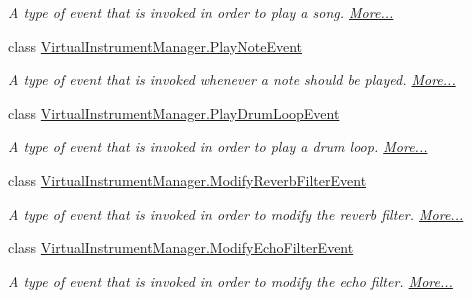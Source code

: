 \begin{DoxyCompactItemize}
\begin{DoxyCompactList}\small\item\em A type of event that is invoked in order to play a song.  \hyperlink{group___virtual_instrument_manager_class_virtual_instrument_manager_1_1_play_song_event}{More...}\end{DoxyCompactList}\item 
class \hyperlink{group___virtual_instrument_manager_class_virtual_instrument_manager_1_1_play_note_event}{Virtual\+Instrument\+Manager.\+Play\+Note\+Event}
\begin{DoxyCompactList}\small\item\em A type of event that is invoked whenever a note should be played.  \hyperlink{group___virtual_instrument_manager_class_virtual_instrument_manager_1_1_play_note_event}{More...}\end{DoxyCompactList}\item 
class \hyperlink{group___virtual_instrument_manager_class_virtual_instrument_manager_1_1_play_drum_loop_event}{Virtual\+Instrument\+Manager.\+Play\+Drum\+Loop\+Event}
\begin{DoxyCompactList}\small\item\em A type of event that is invoked in order to play a drum loop.  \hyperlink{group___virtual_instrument_manager_class_virtual_instrument_manager_1_1_play_drum_loop_event}{More...}\end{DoxyCompactList}\item 
class \hyperlink{group___virtual_instrument_manager_class_virtual_instrument_manager_1_1_modify_reverb_filter_event}{Virtual\+Instrument\+Manager.\+Modify\+Reverb\+Filter\+Event}
\begin{DoxyCompactList}\small\item\em A type of event that is invoked in order to modify the reverb filter.  \hyperlink{group___virtual_instrument_manager_class_virtual_instrument_manager_1_1_modify_reverb_filter_event}{More...}\end{DoxyCompactList}\item 
class \hyperlink{group___virtual_instrument_manager_class_virtual_instrument_manager_1_1_modify_echo_filter_event}{Virtual\+Instrument\+Manager.\+Modify\+Echo\+Filter\+Event}
\begin{DoxyCompactList}\small\item\em A type of event that is invoked in order to modify the echo filter.  \hyperlink{group___virtual_instrument_manager_class_virtual_instrument_manager_1_1_modify_echo_filter_event}{More...}\end{DoxyCompactList}\item 

\end{DoxyCompactItemize}
